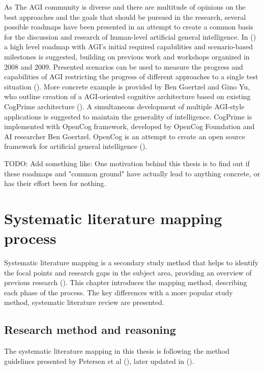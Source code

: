 \documentclass[utf8,english]{gradu3}
\begin{document}
As The AGI community is diverse and there are multitude of opinions on the best approaches and the goals that should be pursued in the research, several possible roadmaps have been presented in an attempt to create a common basis for the discussion and research of human-level artificial general intelligence. In (\cite{adams2012}) a high level roadmap with AGI's initial required capabilities and scenario-based milestones is suggested, building on previous work and workshops organized in 2008 and 2009. Presented scenarios can be used to measure the progress and capabilities of AGI restricting the progress of different approaches to a single test situation (\cite{adams2012}).
More concrete example is provided by Ben Goertzel and Gino Yu, who outline creation of a AGI-oriented cognitive architecture based on existing CogPrime architecture (\cite{goertzel2014map}). A simultaneous development of multiple AGI-style applications is suggested to maintain the generality of intelligence. CogPrime is implemented with OpenCog framework, developed by OpenCog Foundation and AI researcher Ben Goertzel. OpenCog is an attempt to create an open source framework for artificial general intelligence (\cite{opencogwiki,goertzel2012cog}).

TODO: Add something like: One motivation behind this thesis is to find out if these roadmaps and "common ground" have actually lead to anything concrete, or has their effort been for nothing.


\chapter{Systematic literature mapping process}


\label{method}

Systematic literature mapping is a secondary study method that helps to identify the focal points and research gaps in the subject area, providing an overview of previous research (\cite{petersen2008}). This chapter introduces the mapping method, describing each phase of the process. The key differences with a more popular study method, systematic literature review are presented.

\section{Research method and reasoning}

The systematic literature mapping in this thesis is following the method guidelines presented by Petersen et al (\cite{petersen2008}), later updated in (\cite{petersen2015}).
\end{document}
